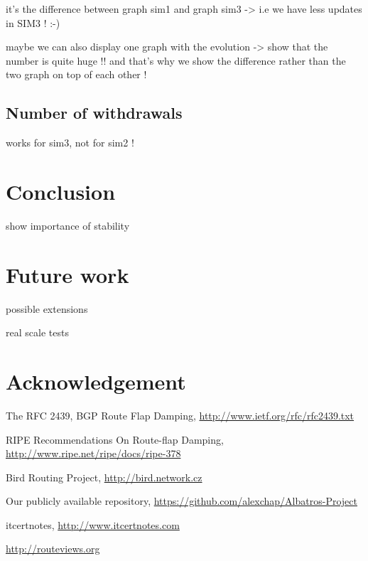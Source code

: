\documentclass[a4paper,english]{IEEEtran}
\begin{document}
it's the difference between graph sim1 and graph sim3 -> i.e we have
less updates in SIM3 ! :-)

maybe we can also display one graph with the evolution -> show that
the number is quite huge !! and that's why we show the difference
rather than the two graph on top of each other !


\subsection{Number of withdrawals}

works for sim3, not for sim2 !


\section{Conclusion}

show importance of stability


\section{Future work}

possible extensions

real scale tests


\section{Acknowledgement}

\begin{thebibliography}{6}

The RFC 2439, BGP Route Flap Damping, \href{http://www.ietf.org/rfc/rfc2439.txt}{http://www.ietf.org/rfc/rfc2439.txt}

 RIPE Recommendations On Route-flap
Damping, \href{http://www.ripe.net/ripe/docs/ripe-378}{http://www.ripe.net/ripe/docs/ripe-378}

Bird Routing Project, \href{http://bird.network.cz}{http://bird.network.cz}

Our publicly available repository, \href{https://github.com/alexchap/Albatros-Project}{https://github.com/alexchap/Albatros-Project}

itcertnotes, \href{www.itcertnotes.com}{http://www.itcertnotes.com}

\href{http://routeviews.org}{http://routeviews.org} 

\end{thebibliography}
\end{document}
